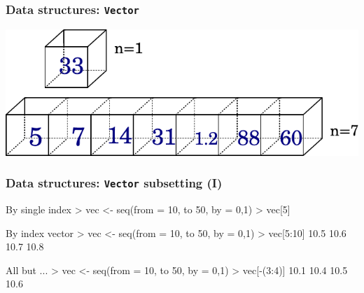 \documentclass[ucs]{beamer}
\begin{document}
\begin{frame}
  \frametitle{Data structures: \texttt{Vector} }
  \includegraphics[width=1\linewidth]{./imgs/vector.pdf}
\end{frame}

\begin{frame}
  \frametitle{Data structures: \texttt{Vector} subsetting (I)}
  
  \begin{block}{By single index}
    \ttfamily
    > vec <- seq(from = 10, to 50, by = 0,1)\newline
    > vec[5] \newline
    [1] 
  \end{block}
  
  \begin{block}{By index vector}  
    \ttfamily
    > vec <- seq(from = 10, to 50, by = 0,1)\newline
    > vec[5:10] 10.5 10.6 10.7 10.8
  \end{block}
  
  \begin{block}{All but ...}
    \ttfamily
    > vec <- seq(from = 10, to 50, by = 0,1)\newline
    > vec[-(3:4)]  10.1 10.4 10.5 10.6
  \end{block}
  
\end{frame}
\end{document}
